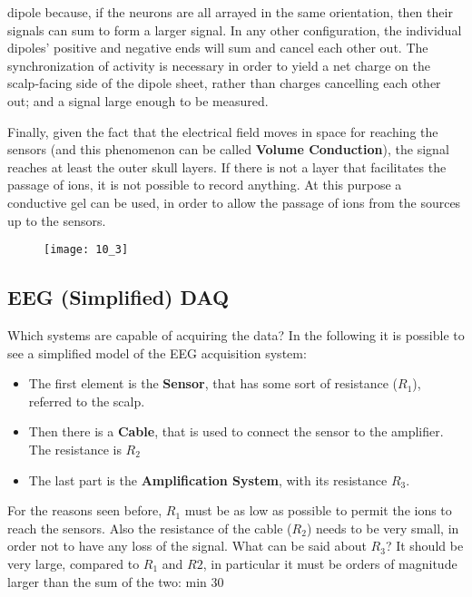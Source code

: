 dipole because, if the neurons are all arrayed in the same orientation, then their signals can sum to form a larger signal. 
In any other configuration, the individual dipoles' positive and negative ends will sum and cancel each other out. The synchronization 
of activity is necessary in order to yield a net charge on the scalp-facing side of the dipole sheet, rather than charges cancelling each other out; 
and a signal large enough to be measured.
\par\medskip
Finally, given the fact that the electrical field moves in space for reaching the sensors (and this phenomenon can be called \textbf{Volume Conduction}),
the signal reaches at least the outer skull layers. If there is not a layer that facilitates the passage of ions, it is not possible to record anything. 
At this purpose a conductive gel can be used, in order to allow the passage of ions from the sources up to the sensors.
\begin{figure}[H]
    \texttt{[image: 10\_3]}
    \centering
\end{figure}

\subsection{EEG (Simplified) DAQ}
Which systems are capable of acquiring the data? In the following it is possible to see a simplified model of the EEG acquisition system:
\begin{itemize}
    \item The first element is the \textbf{Sensor}, that has some sort of resistance (\(R_1\)), referred to the scalp.
    \item Then there is a \textbf{Cable}, that is used to connect the sensor to the amplifier. The resistance is \(R_2\)
    \item The last part is the \textbf{Amplification System}, with its resistance \(R_3\).
\end{itemize}
For the reasons seen before, \(R_1\) must be as low as possible to permit the ions to reach the sensors. Also the resistance of the cable 
(\(R_2\)) needs to be very small, in order not to have any loss of the signal. What can be said about \(R_3\)? 
It should be very large, compared to \(R_1\) and \(R2\), in particular it must be orders of magnitude larger than the sum of the two: 
min 30
